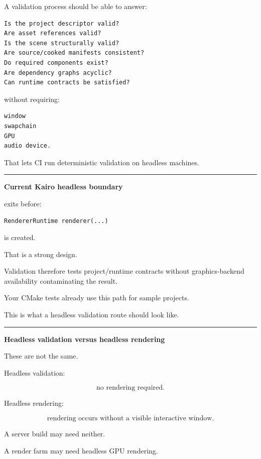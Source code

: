 A validation process should be able to answer:

\begin{verbatim}
Is the project descriptor valid?
Are asset references valid?
Is the scene structurally valid?
Are source/cooked manifests consistent?
Do required components exist?
Are dependency graphs acyclic?
Can runtime contracts be satisfied?
\end{verbatim}

without requiring:

\begin{verbatim}
window
swapchain
GPU
audio device.
\end{verbatim}

That lets CI run deterministic validation on headless machines.

\begin{center}\rule{0.5\linewidth}{0.5pt}\end{center}

\textbf{Current Kairo headless boundary}

 exits before:

\begin{verbatim}
RendererRuntime renderer(...)
\end{verbatim}

is created.

That is a strong design.

Validation therefore tests project/runtime contracts without graphics-backend availability contaminating the result.

Your CMake tests already use this path for sample projects.

This is what a headless validation route should look like.

\begin{center}\rule{0.5\linewidth}{0.5pt}\end{center}

\textbf{Headless validation versus headless rendering}

These are not the same.

Headless validation:

\[
\text{no rendering required}.
\]

Headless rendering:

\[
\text{rendering occurs without a visible interactive window}.
\]

A server build may need neither.

A render farm may need headless GPU rendering.

